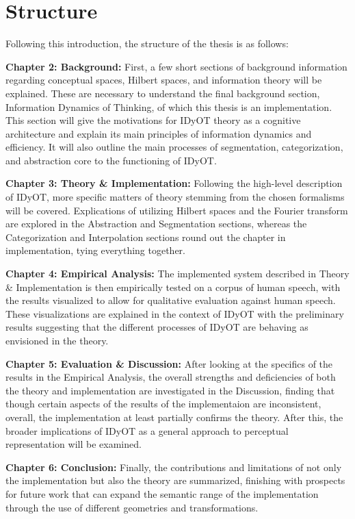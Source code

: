 \section{Structure}
\label{section:structure}

Following this introduction, the structure of the thesis is as follows:

\textbf{Chapter 2: Background:} First, a few short sections of background information regarding conceptual spaces, Hilbert spaces, and information theory will be explained. These are necessary to understand the final background section, Information Dynamics of Thinking, of which this thesis is an implementation.  This section will give the motivations for IDyOT theory as a cognitive architecture and explain its main principles of information dynamics and efficiency.  It  will also outline the main processes of segmentation, categorization, and abstraction core to the functioning of IDyOT.

\textbf{Chapter 3: Theory \& Implementation:} Following the high-level description of IDyOT, more specific matters of theory stemming from the chosen formalisms will be covered.  Explications of utilizing Hilbert spaces and the Fourier transform are explored in the Abstraction and Segmentation sections, whereas the Categorization and Interpolation sections round out the chapter in implementation, tying everything together.

\textbf{Chapter 4: Empirical Analysis:}  The implemented system described in Theory \& Implementation is then empirically tested on a corpus of human speech, with the results visualized to allow for qualitative evaluation against human speech.  These visualizations are explained in the context of IDyOT with the preliminary results suggesting that the different processes of IDyOT are behaving as envisioned in the theory.

\textbf{Chapter 5: Evaluation \& Discussion:} After looking at the specifics of the results in the Empirical Analysis, the overall strengths and deficiencies of both the theory and implementation are investigated in the Discussion, finding that though certain aspects of the results of the implementaion are inconsistent, overall, the implementation at least partially confirms the theory.  After this, the broader implications of IDyOT as a general approach to perceptual representation will be examined.

\textbf{Chapter 6: Conclusion:} Finally, the contributions and limitations of not only the implementation but also the theory are summarized, finishing with prospects for future work that can expand the semantic range of the implementation through the use of different geometries and transformations.
